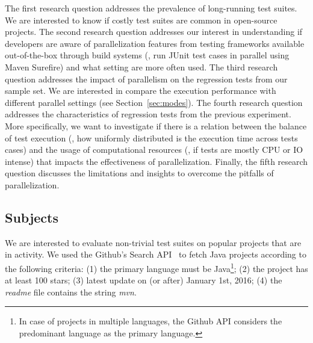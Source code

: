 The first research question addresses the prevalence of long-running
test suites. We are interested to know if costly test suites are
common in open-source projects.  The second research question
addresses our interest in understanding if developers are aware of
parallelization features from testing frameworks available
out-of-the-box through build systems (\eg, run JUnit test cases in
parallel using Maven Surefire) and what setting are more often used.
The third research question addresses the impact of parallelism on the
regression tests from our sample set. We are interested in compare the
execution performance with different parallel settings (see
Section~\ref{sec:modes}). The fourth research question addresses the
characteristics of regression tests from the previous experiment.
More specifically, we want to investigate if there is a relation
between the balance of test execution (\ie, how uniformly distributed
is the execution time across tests cases) and the usage of
computational resources (\ie, if tests are mostly CPU or IO intense)
that impacts the effectiveness of parallelization. Finally, the fifth
research question discusses the limitations and insights to overcome
the pitfalls of parallelization.


\subsection{Subjects}
\label{sec:subjects}

We are interested to evaluate non-trivial test suites on popular
projects that are in activity. We used the Github's Search
API~\cite{githubsearch} to fetch Java projects according to the
following criteria: (1) the primary language must be Java\footnote{In
case of projects in multiple languages, the Github API considers the
predominant language as the primary language.}; (2) the project has at
least 100 stars; (3) latest update on (or after) January 1st, 2016;
(4) the \emph{readme} file contains the string \emph{mvn}.

